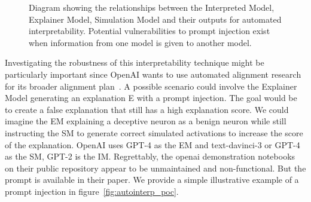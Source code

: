 \begin{figure}[h!]
  \centering
{}
\caption{Diagram showing the relationships between the Interpreted Model, Explainer Model, Simulation Model and their outputs for automated interpretability. Potential vulnerabilities to prompt injection exist when information from one model is given to another model.}
  \label{fig:autointerp}
\end{figure}

Investigating the robustness of this interpretability technique might be particularly important since OpenAI wants to use automated alignment research for its broader alignment plan~\citep{openai2022alignment}. A possible scenario could involve the Explainer Model generating an explanation E with a prompt injection. The goal would be to create a false explanation that still has a high explanation score. We could imagine the EM explaining a deceptive neuron as a benign neuron while still instructing the SM to generate correct simulated activations to increase the score of the explanation. OpenAI uses GPT-4 as the EM and text-davinci-3 or GPT-4 as the SM, GPT-2 is the IM. Regrettably, the openai demonstration notebooks on their public repository appear to be unmaintained and non-functional. But the prompt is available in their paper.
We provide a simple illustrative example of a prompt injection in figure~\ref{fig:autointerp_poc}.


